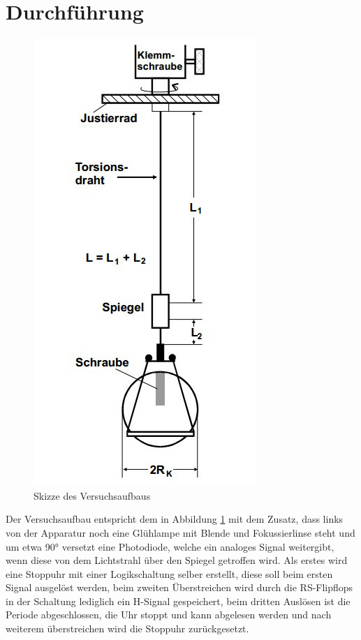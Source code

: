   \section{Durchführung}
   \begin{figure}
		\vspace{-0.8 cm}
		\centering
		\includegraphics*[scale = 0.5]{Grafik/Versuchsaufbau.jpg}%
		\caption{Skizze des Versuchsaufbaus}
		\label{Aufbau}%
   \end{figure}
    Der Versuchsaufbau entspricht dem in Abbildung \ref{Aufbau} mit dem Zusatz, dass links von der Apparatur 
    noch eine Glühlampe mit Blende und Fokussierlinse steht und um etwa 90° versetzt eine 
   Photodiode, welche ein analoges Signal weitergibt, wenn diese von dem Lichtstrahl über den Spiegel 
    getroffen wird.
   Als erstes wird eine Stoppuhr mit einer Logikschaltung selber erstellt, diese soll beim ersten Signal ausgelöst werden, 
   beim zweiten Überstreichen wird durch die RS-Flipflops in der Schaltung lediglich ein H-Signal gespeichert, 
   beim dritten Auslösen ist die Periode abgeschlossen, die Uhr stoppt und kann abgelesen werden 
   und nach weiterem überstreichen wird die Stoppuhr zurückgesetzt.
   
